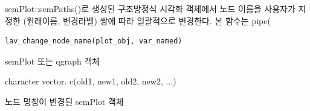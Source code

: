 \documentclass[a4paper]{book}
\begin{document}
%
\begin{Description}
semPlot::semPaths()로 생성된 구조방정식 시각화 객체에서
노드 이름을 사용자가 지정한 (원래이름, 변경라벨) 쌍에 따라
일괄적으로 변경한다.
본 함수는 pipe(
\end{Description}
%
\begin{Usage}
\begin{verbatim}
lav_change_node_name(plot_obj, var_named)
\end{verbatim}
\end{Usage}
%
\begin{Arguments}
\begin{ldescription}
\item[\code{plot\_obj}] semPlot 또는 qgraph 객체

\item[\code{var\_named}] character vector.
c(old1, new1, old2, new2, ...)
\end{ldescription}
\end{Arguments}
%
\begin{Value}
노드 명칭이 변경된 semPlot 객체
\end{Value}
%
\end{document}
